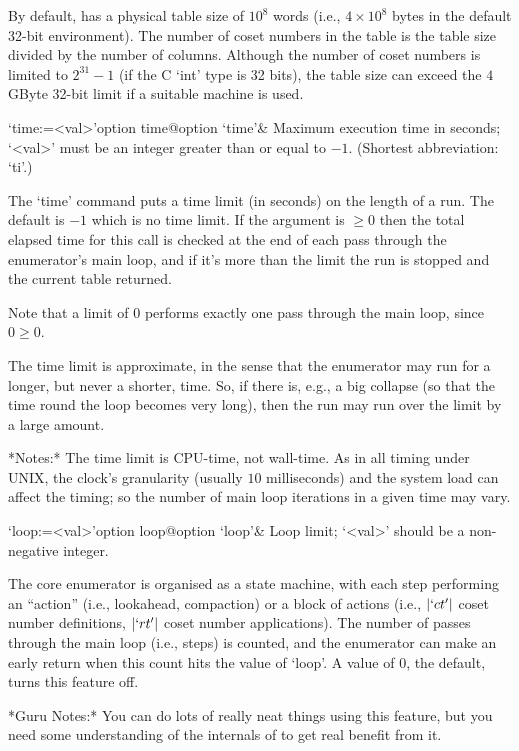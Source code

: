 By default, {\ACE} has a physical table size of $10^8$ words (i.e., $4
\times 10^8$ bytes in the  default 32-bit environment).  The number of
coset numbers in the table is  the table size divided by the number of
columns.   Although  the  number   of  coset  numbers  is  limited  to
$2^{31}-1$ (if the C `int' type is 32 bits), the table size can exceed
the $4$GByte 32-bit limit if a suitable machine is used.

\>`time:=<val>'{option time}@{option `time'}&
Maximum execution time in seconds; `<val>' must be an integer  greater
than or equal to $-1$. (Shortest abbreviation: `ti'.)

The `time' command  puts a time limit (in seconds) on  the length of a
run. The default is $-1$  which is no  time limit. If the  argument is
$\ge0$ then the total elapsed time for this call is checked at the end
of each pass through the enumerator's main loop, and if it's more than
the limit the run is stopped and the current table returned.

Note that a limit of $0$ performs exactly one pass  through  the  main
loop, since $0 \ge 0$.

The time  limit is approximate, in  the sense that  the enumerator may
run for a longer, but never a shorter, time.  So, if there is, e.g., a
big collapse (so that the time round the loop becomes very long), then
the run may run over the limit by a large amount.

*Notes:*
The time limit is CPU-time, not wall-time.  As  in  all  timing  under
UNIX, the clock's granularity  (usually  $10$  milliseconds)  and  the
system load can  affect  the  timing;  so  the  number  of  main  loop
iterations in a given time may vary.

\>`loop:=<val>'{option loop}@{option `loop'}&
Loop limit; `<val>' should be a non-negative integer.

The core enumerator is organised as a state machine,  with  each  step
performing an ``action'' (i.e., lookahead, compaction) or a  block  of
actions (i.e.,  $|`ct'|$  coset  number  definitions,  $|`rt'|$  coset
number applications). The number  of  passes  through  the  main  loop
(i.e., steps) is counted, and the enumerator can make an early  return
when this count hits the value of `loop'. A value of $0$, the default,
turns this feature off.

*Guru Notes:*
You can do lots of really neat things using this feature, but you need
some understanding of the internals of {\ACE} to get real benefit from
it.

